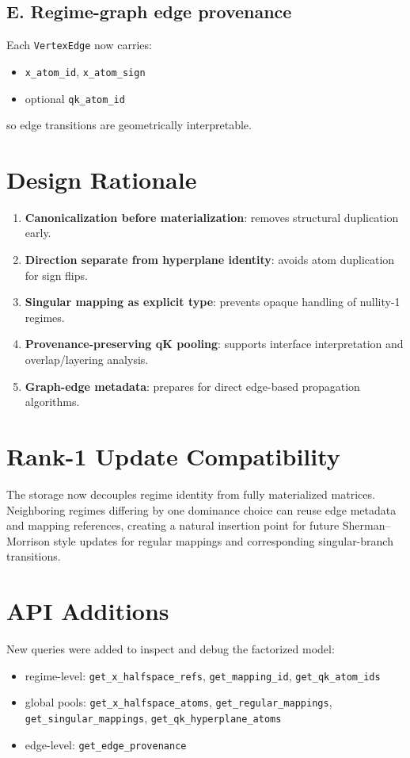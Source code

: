 \documentclass[11pt]{article}
\begin{document}
\subsection*{E. Regime-graph edge provenance}
Each \texttt{VertexEdge} now carries:
\begin{itemize}[leftmargin=2em]
\item \texttt{x\_atom\_id}, \texttt{x\_atom\_sign}
\item optional \texttt{qk\_atom\_id}
\end{itemize}
so edge transitions are geometrically interpretable.

\section{Design Rationale}
\begin{enumerate}[leftmargin=2em]
\item \textbf{Canonicalization before materialization}: removes structural duplication early.
\item \textbf{Direction separate from hyperplane identity}: avoids atom duplication for sign flips.
\item \textbf{Singular mapping as explicit type}: prevents opaque handling of nullity-1 regimes.
\item \textbf{Provenance-preserving qK pooling}: supports interface interpretation and overlap/layering analysis.
\item \textbf{Graph-edge metadata}: prepares for direct edge-based propagation algorithms.
\end{enumerate}

\section{Rank-1 Update Compatibility}
The storage now decouples regime identity from fully materialized matrices. Neighboring regimes differing by one dominance choice can reuse edge metadata and mapping references, creating a natural insertion point for future Sherman--Morrison style updates for regular mappings and corresponding singular-branch transitions.

\section{API Additions}
New queries were added to inspect and debug the factorized model:
\begin{itemize}[leftmargin=2em]
\item regime-level: \texttt{get\_x\_halfspace\_refs}, \texttt{get\_mapping\_id}, \texttt{get\_qk\_atom\_ids}
\item global pools: \texttt{get\_x\_halfspace\_atoms}, \texttt{get\_regular\_mappings}, \texttt{get\_singular\_mappings}, \texttt{get\_qk\_hyperplane\_atoms}
\item edge-level: \texttt{get\_edge\_provenance}
\end{itemize}
\end{document}
